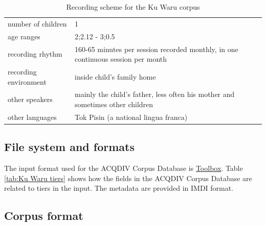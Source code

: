 \documentclass[a4paper, 11pt]{book}
\begin{document}
\begin{table}[ht!]
	\centering
	\begin{tabular}{ll}
		\toprule
		number of children & 1 \\
		age ranges & 2;2.12 - 3;0.5 \\
		recording rhythm & 160-65 minutes per session recorded monthly, in one continuous session per month \\
		recording environment & inside child's family home \\
		other speakers & mainly the child's father, less often his mother and sometimes other children \\
		other languages & Tok Pisin (a national lingua franca) \\
		\bottomrule
	\end{tabular}
	\caption{Recording scheme for the Ku Waru corpus}
	\label{tab:Ku Waru recording scheme}
\end{table}

\subsection{File system and formats}
The input format used for the ACQDIV Corpus Database is \hyperref[subsec:Toolbox]{Toolbox}. Table \autoref{tab:Ku Waru tiers} shows how the fields in the ACQDIV Corpus Database are related to tiers in the input. The metadata are provided in IMDI format.

\subsection{Corpus format}

\end{document}
